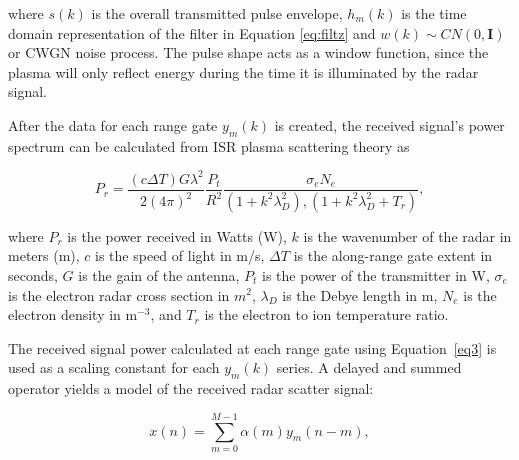 \noindent where $s(k)$ is the overall transmitted pulse envelope, $h_m(k)$ is the time domain representation of the filter in Equation \ref{eq:filtz} and $w(k)\sim CN(0,\mathbf{I})$ or CWGN noise process. The pulse shape acts as a window function, since the plasma will only reflect energy during the time it is illuminated by the radar signal. 

%

After the data for each range gate $y_m(k)$ is created, the received signal's power spectrum can be calculated from ISR plasma scattering theory as 

\begin{equation}
\label{eq3}
P_r = \frac{\left(c\Delta T\right) G \lambda^2}{2(4\pi)^2}\frac{P_t }{R^2}\frac{\sigma_e N_e}{(1+k^2\lambda_D^2),(1+k^2\lambda_D^2 + T_r)},
\end{equation}
 
 \noindent where $P_r$ is the power received in Watts (W), $k$ is the wavenumber of the radar in meters (m), $c$ is the speed of light in m/s, $\Delta T$ is the along-range gate extent in seconds, $G$ is the gain of the antenna, $P_t$ is the power of the transmitter in W, $\sigma_e$ is the electron radar cross section in $m^2$,  $\lambda_D$ is the Debye length in m, $N_e$ is the electron density in m$^{-3}$, and $T_r$ is the electron to ion temperature ratio.
  
The received signal power calculated at each range gate using Equation~\ref{eq3} is used as a scaling constant for each $y_m(k)$ series.  A delayed and summed operator yields a model of the received radar scatter signal:
 
\begin{equation}
\label{eq4}
x(n) = \displaystyle\sum\limits_{m =0}^{M-1} \alpha(m)y_m(n-m),
\end{equation}

